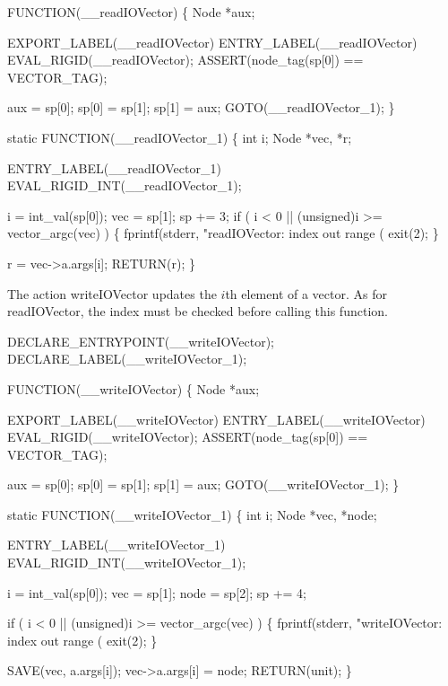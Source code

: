 FUNCTION(__readIOVector)
\{
    Node *aux;

    EXPORT_LABEL(__readIOVector)
 ENTRY_LABEL(__readIOVector)
    EVAL_RIGID(__readIOVector);
    ASSERT(node_tag(sp[0]) == VECTOR_TAG);

    aux   = sp[0];
    sp[0] = sp[1];
    sp[1] = aux;
    GOTO(__readIOVector_1);
\}

static
FUNCTION(__readIOVector_1)
\{
    int  i;
    Node *vec, *r;

 ENTRY_LABEL(__readIOVector_1)
    EVAL_RIGID_INT(__readIOVector_1);

    i   = int_val(sp[0]);
    vec = sp[1];
    sp += 3;
    if ( i < 0 || (unsigned)i >= vector_argc(vec) )
    \{
        fprintf(stderr, "readIOVector: index out range (%
        exit(2);
    \}

    r = vec->a.args[i];
    RETURN(r);
\}

\nwendcode{}\nwdocspar
The action {\Tt{}writeIOVector\nwendquote} updates the $i$th element of a vector. As
for {\Tt{}readIOVector\nwendquote}, the index must be checked before calling this
function.

\nwenddocs{}\plusendmoddef\nwstartdeflinemarkup{}\nwenddeflinemarkup
DECLARE_ENTRYPOINT(__writeIOVector);
DECLARE_LABEL(__writeIOVector_1);

FUNCTION(__writeIOVector)
\{
    Node *aux;

    EXPORT_LABEL(__writeIOVector)
 ENTRY_LABEL(__writeIOVector)
    EVAL_RIGID(__writeIOVector);
    ASSERT(node_tag(sp[0]) == VECTOR_TAG);

    aux   = sp[0];
    sp[0] = sp[1];
    sp[1] = aux;
    GOTO(__writeIOVector_1);
\}

static
FUNCTION(__writeIOVector_1)
\{
    int  i;
    Node *vec, *node;

 ENTRY_LABEL(__writeIOVector_1)
    EVAL_RIGID_INT(__writeIOVector_1);

    i    = int_val(sp[0]);
    vec  = sp[1];
    node = sp[2];
    sp  += 4;

    if ( i < 0 || (unsigned)i >= vector_argc(vec) )
    \{
        fprintf(stderr, "writeIOVector: index out range (%
        exit(2);
    \}

    SAVE(vec, a.args[i]);
    vec->a.args[i] = node;
    RETURN(unit);
\}

